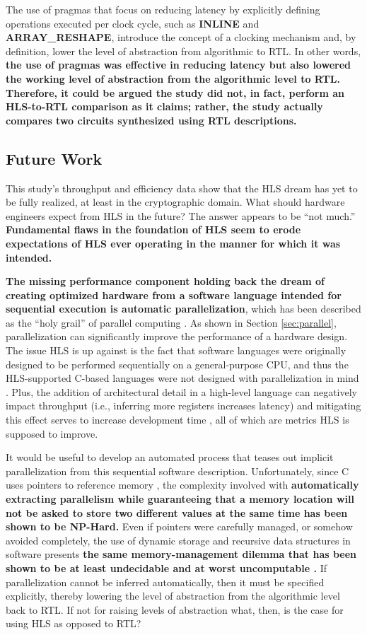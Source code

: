\documentclass[12pt,journal,compsoc,onecolumn]{IEEEtran}
\begin{document}
The use of pragmas that focus on reducing latency by explicitly defining operations executed per clock cycle, such as \textbf{INLINE} and \textbf{ARRAY\_RESHAPE}, introduce the concept of a clocking mechanism and, by definition, lower the level of abstraction from algorithmic to RTL. In other words, \textbf{the use of pragmas was effective in reducing latency but also lowered the working level of abstraction from the algorithmic level to RTL. Therefore, it could be argued the study did not, in fact, perform an HLS-to-RTL comparison as it claims; rather, the study actually compares two circuits synthesized using RTL descriptions.}

\subsection{Future Work}\label{sec:future}
This study's throughput and efficiency data show that the HLS dream has yet to be fully realized, at least in the cryptographic domain. What should hardware engineers expect from HLS in the future? The answer appears to be ``not much.'' \textbf{Fundamental flaws in the foundation of HLS seem to erode expectations of HLS ever operating in the manner for which it was intended.}

\textbf{The missing performance component holding back the dream of creating optimized hardware from a software language intended for sequential execution is automatic parallelization}, which has been described as the ``holy grail'' of parallel computing \cite{holygrail}. As shown in Section \ref{sec:parallel}, parallelization can significantly improve the performance of a hardware design. The issue HLS is up against is the fact that software languages were originally designed to be performed sequentially on a general-purpose CPU, and thus the HLS-supported C-based languages were not designed with parallelization in mind \cite{clanguage}. Plus, the addition of architectural detail in a high-level language can negatively impact throughput (i.e., inferring more registers increases latency) and mitigating this effect serves to increase development time \cite{bsv}, all of which are metrics HLS is supposed to improve. 

It would be useful to develop an automated process that teases out implicit parallelization from this sequential software description. Unfortunately, since C uses pointers to reference memory \cite{cpointers}, the complexity involved with \textbf{automatically extracting parallelism while guaranteeing that a memory location will not be asked to store two different values at the same time has been shown to be NP-Hard\cite{aliasinghard}.} Even if pointers were carefully managed, or somehow avoided completely, the use of dynamic storage and recursive data structures in software presents \textbf{the same memory-management dilemma that has been shown to be at least undecidable and at worst uncomputable \cite{staticanalysis}.} If parallelization cannot be inferred automatically, then it must be specified explicitly, thereby lowering the level of abstraction from the algorithmic level back to RTL\cite{wipliez}. If not for raising levels of abstraction what, then, is the case for using HLS as opposed to RTL?  
\end{document}
